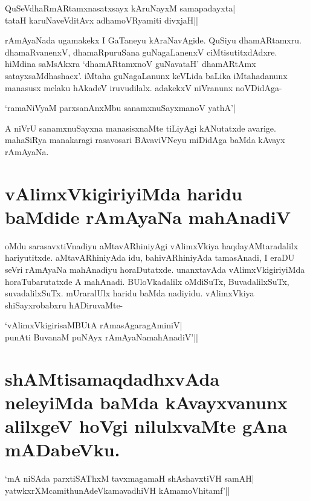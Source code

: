 \begin{shloka} 
QuSeVdhaRmARtamxnasatxsayx kAruNayxM samapadayxta|\label{165d}\\ 
tataH karuNaveVditAvx adhamoVR\s yamiti divxjaH||
\end{shloka} 

rAmAyaNada ugamakekx I GaTaneyu kAraNavAgide. QuSiyu dhamARtamxru. dhamaRvanenxV, dhamaRpuruSana guNagaLanenxV ciMtisutitxdAdxre. hiMdina saMsAkxra `dhamARtamxnoV guNavataH'\label{165a} dhamARtAmx satayxsaMdhashacx'.\label{165b} iMtaha guNagaLanunx keVLida baLika iMtahadanunx manasusx melaku hAkadeV iruvudilalx. adakekxV niVranunx noVDidAga- 

\begin{shloka} 
`ramaNiVyaM parxsanAnxMbu sanamxnuSayxmanoV yathA'|\label{165c}
\end{shloka} 

A niVrU sanamxnuSayxna manasisxnaMte tiLiyAgi kANutatxde avarige. mahaSiRya manakaragi rasavosari BAvaviVNeyu miDidAga baMda kAvayx rAmAyaNa. 

\section*{vAlimxVkigiriyiMda haridu baMdide rAmAyaNa mahAnadiV} 

oMdu sarasavxtiVnadiyu aMtavARhiniyAgi vAlimxVkiya haqdayAMtaradalilx hariyutitxde. aMtavARhiniyAda idu, bahivARhiniyAda tamasAnadi, I eraDU seVri rAmAyaNa mahAnadiyu horaDutatxde. unanxtavAda vAlimxVkigiriyiMda horaTubarutatxde A mahAnadi. BUloVkadalilx oMdiSuTx, BuvadalilxSuTx, suvadalilxSuTx. mUraralUlx haridu baMda nadiyidu. vAlimxVkiya shiSayxrobabxru hADiruvaMte- 

\begin{shloka} 
`vAlimxVkigirisaMBUtA rAmasAgaragAminiV|\label{166b}\\ 
punAti BuvanaM puNAyx rAmAyaNamahAnadiV'||
\end{shloka} 

\section*{shAMtisamaqdadhxvAda neleyiMda baMda kAvayxvanunx alilxgeV hoVgi nilulxvaMte gAna mADabeVku.} 

\begin{shloka} 
`mA niSAda parxtiSAThxM tavxmagamaH shAshavxtiVH samAH|\label{166}\\ 
yatwkxrXMcamithunAdeVkamavadhiVH kAmamoVhitamf'|| 
\end{shloka} 

